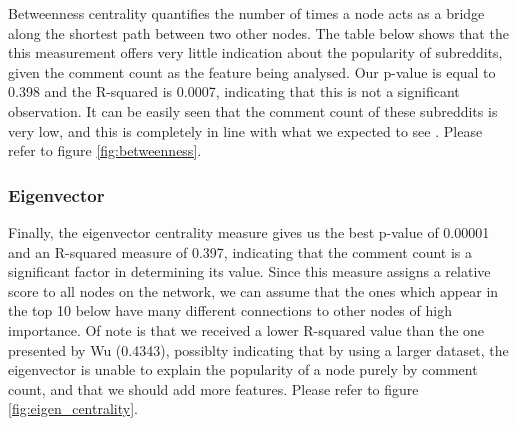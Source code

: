 \documentclass[bsc,frontabs,twoside,singlespacing,parskip,deptreport]{infthesis}
\begin{document}
Betweenness centrality quantifies the number of times a node acts as a bridge along the shortest path between two other nodes. The table below shows that the this measurement offers very little indication about the popularity of subreddits, given the comment count as the feature being analysed. Our p-value is equal to 0.398 and the R-squared is 0.0007, indicating that this is not a significant observation. It can be easily seen that the comment count of these subreddits is very low, and this is completely in line with what we expected to see \cite{masters}. Please refer to figure \ref{fig:betweenness}.

\begin{table}[!h]
\centering
{}
\caption{Top 10 subreddits ordered by their betweenness score}
\label{top-betweenness}
\end{table}

\subsubsection{Eigenvector}

Finally, the eigenvector centrality measure gives us the best p-value of 0.00001 and an R-squared measure of 0.397, indicating that the comment count is a significant factor in determining its value. Since this measure assigns a relative score to all nodes on the network, we can assume that the ones which appear in the top 10 below have many different connections to other nodes of high importance. Of note is that we received a lower R-squared value than the one presented by Wu \cite{masters} (0.4343), possiblty indicating that by using a larger dataset, the eigenvector is unable to explain the popularity of a node purely by comment count, and that we should add more features. Please refer to figure \ref{fig:eigen_centrality}.
\end{document}
